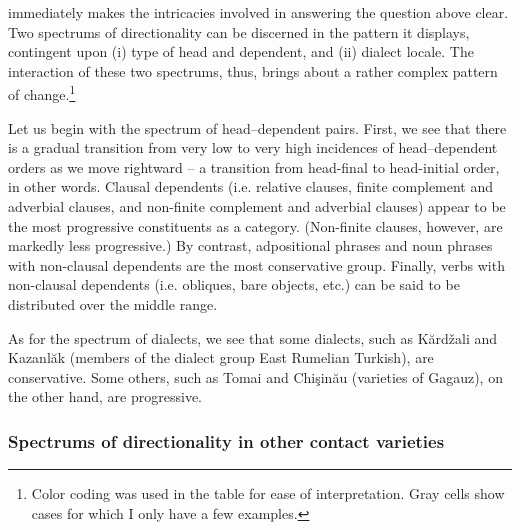 \documentclass[output=paper,colorlinks,citecolor=brown]{langscibook}
\begin{document}
 immediately makes the intricacies involved in answering the question above clear. Two spectrums of directionality can be discerned in the pattern it displays, contingent upon (i) type of head and dependent, and (ii) dialect locale. The interaction of these two spectrums, thus, brings about a rather complex pattern of change.\footnote{Color coding was used in the table for ease of interpretation. Gray cells show cases for which I only have a few examples.} 

Let us begin with the spectrum of head--dependent pairs. First, we see that there is a gradual transition from very low to very high incidences of head--dependent orders as we move rightward -- a transition from head-final to head-initial order, in other words. Clausal dependents (i.e. relative clauses, finite complement and adverbial clauses, and non-finite complement and adverbial clauses) appear to be the most progressive constituents as a category. (Non-finite clauses, however, are markedly less progressive.) By contrast, adpositional phrases and noun phrases with non-clausal dependents are the most conservative group. Finally, verbs with non-clausal dependents (i.e. obliques, bare objects, etc.) can be said to be distributed over the middle range. 

As for the spectrum of dialects, we see that some dialects, such as Kărdžali and Kazanlăk (members of the dialect group East Rumelian Turkish), are conservative. Some others, such as Tomai and Chişinău (varieties of Gagauz), on the other hand, are progressive.

\subsubsection{Spectrums of directionality in other contact varieties}
\label{sec:keskin:two_spectrums_NCV}
\end{document}
